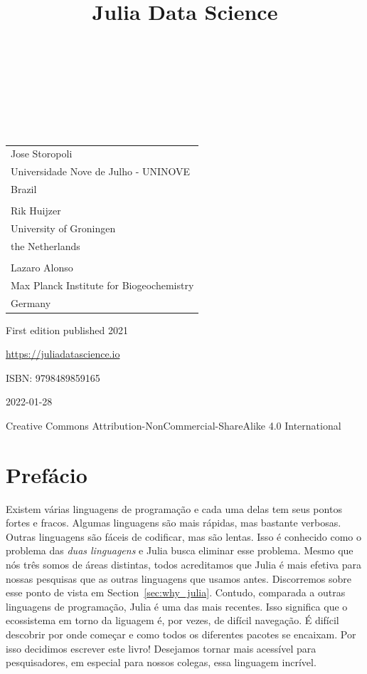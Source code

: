 \documentclass[
  notoc %
]{tufte-book}
\title{Julia Data Science}
\author{\noindent{Jose Storopoli}\\[3mm] \noindent{Rik
Huijzer}\\[3mm] \noindent{Lazaro Alonso}\\[3mm] }
\date{}
\begin{document}
\makeatletter
\thispagestyle{empty}
\vfill
{\Huge\bf
\noindent
\@title
}\\[1in]
{\Large
\noindent
\@author
}
\makeatother

\makeatletter
\newpage
\thispagestyle{empty}
\vfill
{\noindent
\begin{tabular}{l} Jose Storopoli\\ Universidade Nove de Julho - UNINOVE\\ Brazil\\ \\ Rik Huijzer\\ University of Groningen\\ the Netherlands\\ \\ Lazaro Alonso\\ Max Planck Institute for Biogeochemistry\\ Germany \end{tabular}
}
\vfill
{\small
First edition published 2021

\url{https://juliadatascience.io}

ISBN: 9798489859165

2022-01-28

Creative Commons Attribution-NonCommercial-ShareAlike 4.0 International
}
\makeatother


\frontmatter
\mainmatter

\setcounter{tocdepth}{1}
\tableofcontents

\justifying

\setlength{\parindent}{0pt}

\hypertarget{sec:preface}{%
\chapter{Prefácio}\label{sec:preface}}

Existem várias linguagens de programação e cada uma delas tem seus
pontos fortes e fracos. Algumas linguagens são mais rápidas, mas
bastante verbosas. Outras linguagens são fáceis de codificar, mas são
lentas. Isso é conhecido como o problema das \emph{duas linguagens} e
Julia busca eliminar esse problema. Mesmo que nós três somos de áreas
distintas, todos acreditamos que Julia é mais efetiva para nossas
pesquisas que as outras linguagens que usamos antes. Discorremos sobre
esse ponto de vista em Section~\ref{sec:why_julia}. Contudo, comparada a
outras linguagens de programação, Julia é uma das mais recentes. Isso
significa que o ecossistema em torno da liguagem é, por vezes, de
difícil navegação. É difícil descobrir por onde começar e como todos os
diferentes pacotes se encaixam. Por isso decidimos escrever este livro!
Desejamos tornar mais acessível para pesquisadores, em especial para
nossos colegas, essa linguagem incrível.
\end{document}
